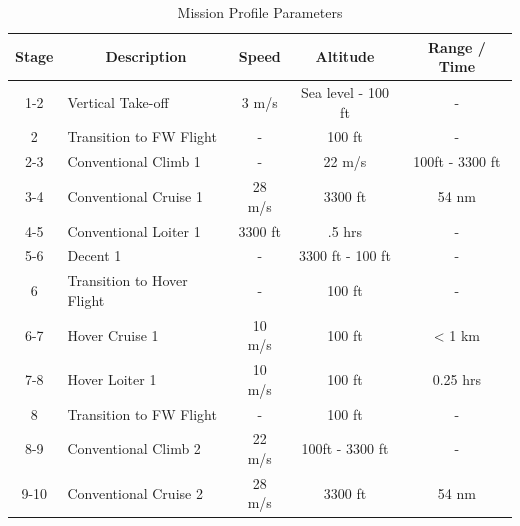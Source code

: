 
\begin{table}[H]
\begin{center}
    \caption{Mission Profile Parameters}
    \label{fig:PP}
\begin{tabular}{|c|l|c|c|c|}
\hline
\textbf{Stage} & \multicolumn{1}{c|}{\textbf{Description}} & \textbf{Speed} & \textbf{Altitude} & \textbf{Range / Time} \\ \hline \hline
1-2            & Vertical Take-off                    &  3 m/s              & Sea level - 100 ft        &       -                \\ \hline
2            & Transition to FW Flight                  & -              & 100 ft        &       -                \\ \hline
2-3            & Conventional Climb 1                                 & -              & 22 m/s         &       100ft - 3300 ft                 \\ \hline
3-4            & Conventional Cruise 1                    & 28 m/s       &      3300 ft              &      54 nm                 \\ \hline
4-5            & Conventional Loiter 1                                  &  3300 ft           & .5 hrs     & -          \\ \hline
5-6            & Decent 1                                  & -              & 3300 ft - 100 ft           & -             \\ \hline
6            & Transition to Hover Flight                                   & -              & 100 ft           & -             \\ \hline
6-7            & Hover Cruise 1                                    & 10 m/s              & 100 ft           &  < 1 km             \\ \hline
7-8            & Hover Loiter 1                                    & 10 m/s              & 100 ft           &  0.25 hrs             \\ \hline
8            & Transition to FW Flight                  & -              & 100 ft        &       -                \\ \hline
8-9            & Conventional Climb 2                                 &22 m/s         &       100ft - 3300 ft & - \\ \hline
9-10            & Conventional Cruise 2                    & 28 m/s       &      3300 ft              &      54 nm                 \\ \hline

\end{tabular}
\end{center}
\end{table}
